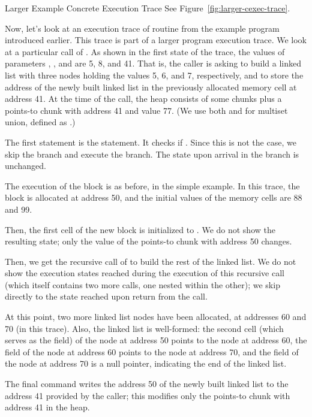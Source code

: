 \documentclass{CSML}
\theoremstyle{definition}\newtheorem{notation}[thm]{Notation}
\theoremstyle{plain}\newtheorem{satz}[thm]{Satz}
\begin{document}
\begin{exa}{Larger Example Concrete Execution Trace}
See Figure~\ref{fig:larger-cexec-trace}.
\end{exa}

Now, let's look at an execution trace of routine 
 from the example program introduced earlier. 
This trace is part of a larger program execution trace. We look 
at a particular call of . As shown in the first 
state of the trace, the values of parameters , 
, and  are 5, 8, and 41. That is, the 
caller is asking  to build a linked list with 
three nodes holding the values 5, 6, and 7, respectively, and 
to store the address of the newly built linked list in the 
previously allocated memory cell at address 41. At the time of 
the call, the heap consists of some chunks  plus a 
points-to chunk with address 41 and value 77. (We use both  and  for multiset union, defined as .)

The first statement is the  statement. It checks 
if . Since this is not the case, we 
skip the  branch and execute the  
branch. The state upon arrival in the  branch is 
unchanged.

The execution of the  block is as before, in 
the simple example. In this trace, the block is allocated at 
address 50, and the initial values of the memory cells are 88 
and 99.

Then, the first cell of the new block is initialized to 
. We do not show the resulting state; only the 
value of the points-to chunk with address 50 changes.

Then, we get the recursive call of  to build 
the rest of the linked list. We do not show the execution 
states reached during the execution of this recursive call 
(which itself contains two more calls, one nested within the 
other); we skip directly to the state reached upon return from 
the call.

At this point, two more linked list nodes have been allocated, 
at addresses 60 and 70 (in this trace). Also, the linked list 
is well-formed: the second cell (which serves as the 
 field) of the node at address 50 points to the 
node at address 60, the  field of the node at 
address 60 points to the node at address 70, and the 
 field of the node at address 70 is a null 
pointer, indicating the end of the linked list. 

The final command writes the address 50 of the newly built 
linked list to the address 41 provided by the caller; this 
modifies only the points-to chunk with address 41 in the heap.
\end{document}
